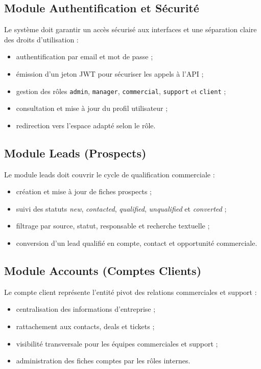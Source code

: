 \subsection{Module Authentification et Sécurité}
Le système doit garantir un accès sécurisé aux interfaces et une séparation claire des droits d'utilisation :
\begin{itemize}
    \item authentification par email et mot de passe ;
    \item émission d'un jeton JWT pour sécuriser les appels à l'API ;
    \item gestion des rôles \texttt{admin}, \texttt{manager}, \texttt{commercial}, \texttt{support} et \texttt{client} ;
    \item consultation et mise à jour du profil utilisateur ;
    \item redirection vers l'espace adapté selon le rôle.
\end{itemize}

\subsection{Module Leads (Prospects)}
Le module leads doit couvrir le cycle de qualification commerciale :
\begin{itemize}
    \item création et mise à jour de fiches prospects ;
    \item suivi des statuts \textit{new}, \textit{contacted}, \textit{qualified}, \textit{unqualified} et \textit{converted} ;
    \item filtrage par source, statut, responsable et recherche textuelle ;
    \item conversion d'un lead qualifié en compte, contact et opportunité commerciale.
\end{itemize}

\subsection{Module Accounts (Comptes Clients)}
Le compte client représente l'entité pivot des relations commerciales et support :
\begin{itemize}
    \item centralisation des informations d'entreprise ;
    \item rattachement aux contacts, deals et tickets ;
    \item visibilité transversale pour les équipes commerciales et support ;
    \item administration des fiches comptes par les rôles internes.
\end{itemize}

